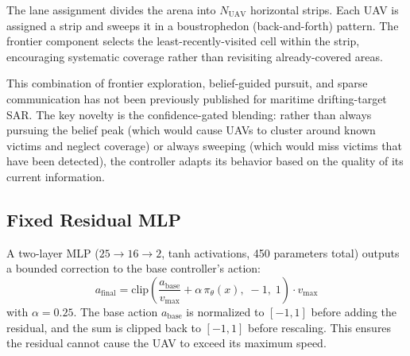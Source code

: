 \documentclass[journal]{IEEEtran}
\begin{document}
The lane assignment divides the arena into $N_{\text{UAV}}$ horizontal strips. Each
UAV is assigned a strip and sweeps it in a boustrophedon (back-and-forth) pattern.
The frontier component selects the least-recently-visited cell within the strip,
encouraging systematic coverage rather than revisiting already-covered areas.

This combination of frontier exploration, belief-guided pursuit, and sparse
communication has not been previously published for maritime drifting-target SAR.
The key novelty is the confidence-gated blending: rather than always pursuing the
belief peak (which would cause UAVs to cluster around known victims and neglect
coverage) or always sweeping (which would miss victims that have been detected),
the controller adapts its behavior based on the quality of its current information.

\subsection{Fixed Residual MLP}
\label{sec:fixed}

A two-layer MLP ($25 \to 16 \to 2$, tanh activations, 450 parameters total) outputs
a bounded correction to the base controller's action:
\begin{equation}
  a_{\text{final}} = \mathrm{clip}\!\left(
    \frac{a_{\text{base}}}{v_{\max}} + \alpha\,\pi_\theta(x),\; -1,\; 1
  \right) \cdot v_{\max}
  \label{eq:fixed}
\end{equation}
with $\alpha = 0.25$. The base action $a_{\text{base}}$ is normalized to $[-1, 1]$
before adding the residual, and the sum is clipped back to $[-1, 1]$ before
rescaling. This ensures the residual cannot cause the UAV to exceed its maximum speed.
\end{document}

